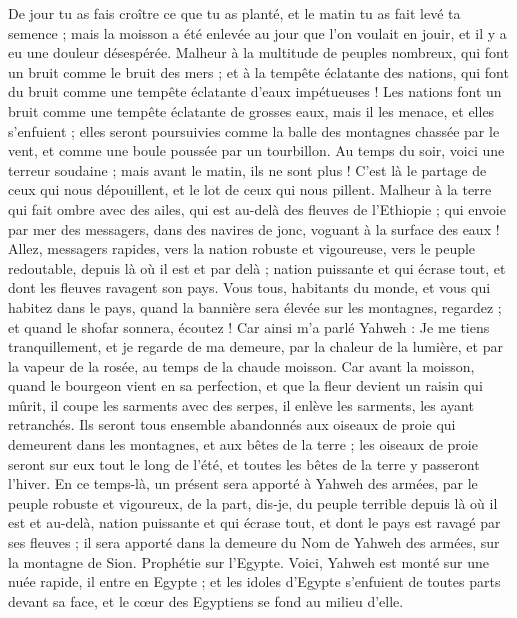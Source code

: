\begin{multicols}{2}
De jour tu as fais croître ce que tu as planté, et le matin tu as fait levé ta semence ; mais la moisson a été enlevée au jour que l'on voulait en jouir, et il y a eu une douleur désespérée.
Malheur à la multitude de peuples nombreux, qui font un bruit comme le bruit des mers ; et à la tempête éclatante des nations, qui font du bruit comme une tempête éclatante d'eaux impétueuses !
Les nations font un bruit comme une tempête éclatante de grosses eaux, mais il les menace, et elles s'enfuient ; elles seront poursuivies comme la balle des montagnes chassée par le vent, et comme une boule poussée par un tourbillon.
Au temps du soir, voici une terreur soudaine ; mais avant le matin, ils ne sont plus ! C'est là le partage de ceux qui nous dépouillent, et le lot de ceux qui nous pillent.
\VerseOne{}Malheur à la terre qui fait ombre avec des ailes, qui est au-delà des fleuves de l'Ethiopie ;
qui envoie par mer des messagers, dans des navires de jonc, voguant à la surface des eaux ! Allez, messagers rapides, vers la nation robuste et vigoureuse, vers le peuple redoutable, depuis là où il est et par delà ; nation puissante et qui écrase tout, et dont les fleuves ravagent son pays.
Vous tous, habitants du monde, et vous qui habitez dans le pays, quand la bannière sera élevée sur les montagnes, regardez ; et quand le shofar sonnera, écoutez !
Car ainsi m'a parlé Yahweh : Je me tiens tranquillement, et je regarde de ma demeure, par la chaleur de la lumière, et par la vapeur de la rosée, au temps de la chaude moisson.
Car avant la moisson, quand le bourgeon vient en sa perfection, et que la fleur devient un raisin qui mûrit, il coupe les sarments avec des serpes, il enlève les sarments, les ayant retranchés.
Ils seront tous ensemble abandonnés aux oiseaux de proie qui demeurent dans les montagnes, et aux bêtes de la terre ; les oiseaux de proie seront sur eux tout le long de l'été, et toutes les bêtes de la terre y passeront l'hiver.
En ce temps-là, un présent sera apporté à Yahweh des armées, par le peuple robuste et vigoureux, de la part, dis-je, du peuple terrible depuis là où il est et au-delà, nation puissante et qui écrase tout, et dont le pays est ravagé par ses fleuves ; il sera apporté dans la demeure du Nom de Yahweh des armées, sur la montagne de Sion.
\VerseOne{}Prophétie sur l'Egypte. Voici, Yahweh est monté sur une nuée rapide, il entre en Egypte ; et les idoles d'Egypte s'enfuient de toutes parts devant sa face, et le cœur des Egyptiens se fond au milieu d'elle.

\end{multicols}
